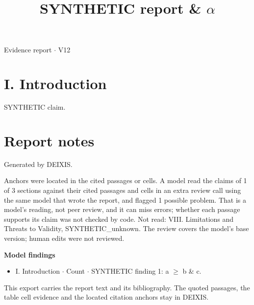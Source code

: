 \documentclass[journal]{IEEEtran}
\begin{document}
\title{SYNTHETIC report \& \ensuremath{\alpha}}

\maketitle

\noindent Evidence report \ensuremath{\cdot} V12

\section*{I. Introduction}

SYNTHETIC claim. \cite{Synth26}

\section*{Report notes}

Generated by DEIXIS.

Anchors were located in the cited passages or cells. A model read the claims of 1 of 3 sections against their cited passages and cells in an extra review call using the same model that wrote the report, and flagged 1 possible problem. That is a model’s reading, not peer review, and it can miss errors; whether each passage supports its claim was not checked by code. Not read: VIII. Limitations and Threats to Validity, SYNTHETIC\_unknown. The review covers the model's base version; human edits were not reviewed.

\noindent\textbf{Model findings}

\begin{itemize}
\item I. Introduction \ensuremath{\cdot} Count \ensuremath{\cdot} SYNTHETIC finding 1: a \ensuremath{\geq} b \& c.
\end{itemize}

This export carries the report text and its bibliography. The quoted passages, the table cell evidence and the located citation anchors stay in DEIXIS.




\end{document}

